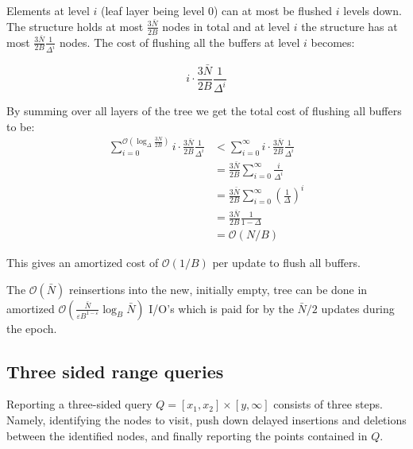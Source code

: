 \documentclass[twoside,11pt,openright]{report}
\def \epsilon {\varepsilon}
\begin{document}
Elements at level $i$ (leaf layer being level 0) can at most be flushed $i$ levels down.
The structure holds at most $\frac{3\bar{N}}{2B}$ nodes in total and at level $i$ the structure has at most $\frac{3\bar{N}}{2B} \frac{1}{\Delta^i}$ nodes. The cost of flushing all the buffers at level $i$ becomes:

$$ i \cdot \frac{3\bar{N}}{2B} \frac{1}{\Delta^i}$$

By summing over all layers of the tree we get the total cost of flushing all buffers to be:
\begin{align*}
\sum\limits_{i=0}^{\mathcal{O}(\log_\Delta \frac{3N}{2B})} i \cdot \frac{3\bar{N}}{2B} \frac{1}{\Delta^i} &< 
\sum\limits_{i=0}^{\infty} i \cdot \frac{3\bar{N}}{2B} \frac{1}{\Delta^i} \\
&= \frac{3\bar{N}}{2B} \sum\limits_{i=0}^{\infty} \frac{i}{\Delta^i} \\
&= \frac{3\bar{N}}{2B} \sum\limits_{i=0}^{\infty} \left(\frac{1}{\Delta}\right)^i \\
&= \frac{3\bar{N}}{2B} \frac{1}{1-\Delta} \\
&= \mathcal{O}(N/B)
\end{align*}

This gives an amortized cost of $\mathcal{O}(1/B)$ per update to flush all buffers.

The $\mathcal{O}(\bar{N})$ reinsertions into the new, initially empty, tree can be done in amortized $\mathcal{O}(\frac{\bar{N}}{\epsilon B^{1-\epsilon}}\log_B\bar{N})$ I/O's which is paid for by the $\bar{N}/2$ updates during the epoch.

\subsection{Three sided range queries}
\label{subsec:brodal_3_sided}
Reporting a three-sided query $Q = \left[ x_1,x_2 \right] \times \left[y, \infty \right]$ consists of three steps. Namely, identifying the nodes to visit, push down delayed insertions and deletions between the identified nodes, and finally reporting the points contained in $Q$.
\end{document}
